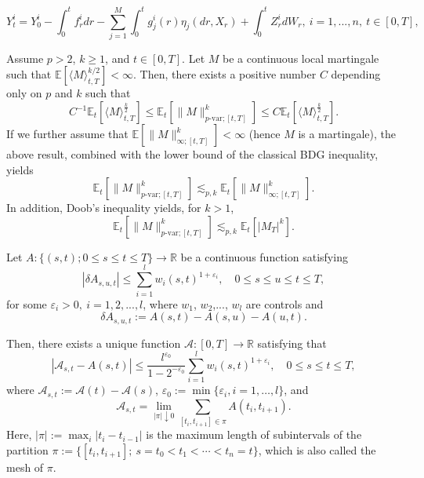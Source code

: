 \documentclass[10pt,a4paper]{amsart}
\def\E{\mathbb E}
\begin{document}
\begin{equation}\label{Y-decomp}	
Y^{i}_{t} = Y^{i}_{0} - \int_{0}^{t} f^{i}_{r} dr - \sum_{j=1}^{M}\int_{0}^{t}g^{i}_{j}(r) \eta_{j}(dr,X_{r}) + \int_{0}^{t}Z^{i}_{r}dW_{r} ,\ i=1,...,n,\ t\in[0,T],
\end{equation}

\begin{lemma}\label{lem:BDG}
Assume $p>2$, $k\ge 1$, and $t\in[0,T]$. Let $M$ be a continuous local martingale such that $\E[\langle M\rangle_{t,T}^{k/2}]<\infty$.  Then, there exists a positive number $C$ depending only on $p$ and $k$ such that
\[C^{-1}\E_{t}[\langle M\rangle_{t,T}^{\frac k2}]\le \mathbb{E}_{t}[\|M\|^{k}_{p\text{-}\mathrm{var};[t,T]}] \le C\E_{t}[\langle M\rangle_{t,T}^{\frac k2}].\]
If we further assume that $\mathbb{E}[\|M\|^{k}_{\infty;[t,T]}]<\infty$ (hence $M$ is a martingale), the above result, combined with the lower bound of the classical BDG inequality, yields 
\[\mathbb{E}_{t}[\|M\|^{k}_{p\text{-}\mathrm{var};[t,T]}] \lesssim_{p,k} \mathbb{E}_{t}[\|M\|^{k}_{\infty;[t,T]}].\]
In addition, Doob's inequality yields, for $k>1$,
\[\mathbb{E}_{t}[\|M\|^{k}_{p\text{-}\mathrm{var};[t,T]}] \lesssim_{p,k} \mathbb{E}_{t}[|M_T|^{k}].\]
\end{lemma}

\begin{lemma}\label{lem:sewing} 
Let $A: \{(s, t); 0 \leq s \le t \leq T\} \rightarrow \mathbb{R}$ be a continuous function satisfying
\begin{equation*}
|\delta A_{s,u,t}| \le \sum_{i = 1}^{l} w_{i}(s,t)^{1+\varepsilon_{i}},\quad 0\le s\le u\le t \le T,
\end{equation*}
for some $\varepsilon_{i}>0,\ i=1,2,...,l$, where $w_{1}$, $w_{2}$,..., $w_{l}$ are controls and $$\delta A_{s,u,t} := A(s,t) - A(s,u) - A(u,t).$$ 

Then, there exists a unique function $\mathcal{A}: [0,T]\rightarrow \mathbb{R}$ satisfying that
\begin{equation*}
|\mathcal{A}_{s,t} - A(s,t)|\le \frac{l^{\varepsilon_{0}}}{1-2^{-\varepsilon_{0}}}\sum_{i = 1}^{l} w_{i}(s,t)^{1+\varepsilon_{i}},\quad  0 \le s \le t \le T,
\end{equation*}
where $\mathcal{A}_{s,t} := \mathcal{A}(t) - \mathcal{A}(s)$, $\varepsilon_{0} := \min\{\varepsilon_{i}, i=1, \dots, l\}$,
and \[\mathcal{A}_{s,t}=\lim_{|\pi|\downarrow 0} \sum\limits_{[t_{i},t_{i+1}]\in\pi} A(t_{i}, t_{i+1}).\] Here, $|\pi|:=\max_{i}|t_i-t_{i-1}|$  is the maximum length of subintervals of the partition $\pi:=\{[t_i,t_{i+1}] ;\  s=t_0<t_1<\cdots<t_n=t\}$, which is also called the mesh of $\pi$. 
\end{lemma}
\end{document}
